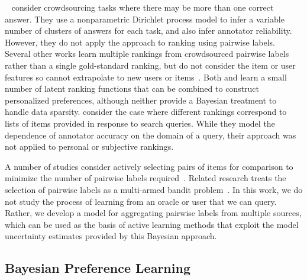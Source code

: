 ~\citet{tian2012learning} consider crowdsourcing tasks where there may be more than one correct answer.
They use a nonparametric Dirichlet process model to infer a variable number of clusters of answers for each task,
and also infer annotator reliability. 
However, they do not apply the approach to ranking using pairwise labels.
Several other works learn multiple rankings from crowdsourced pairwise labels
rather than a single gold-standard ranking, 
but do not consider the item or user features so cannot extrapolate to new users or 
items~\citep{yi_inferring_2013,kim2014latent,wang2016blind,kim2017latent}. 
Both \citet{yi_inferring_2013} and \citet{kim2017latent} learn a small number of
latent ranking functions that can be combined to construct personalized preferences, 
although neither provide a Bayesian treatment to handle data sparsity.
\citet{wang2016blind} consider the case where different rankings correspond to lists of items
provided in response to search queries. 
While they model the dependence of annotator accuracy on the domain of a query,
their approach was not applied to personal or subjective rankings.

A number of studies consider actively selecting pairs of items for
comparison to minimize the number of pairwise labels required~\citep{radlinski2007active,qian2015learning,maystre2017just,cai2017pairwise}.
Related research treats the selection of pairwise labels as a multi-armed bandit problem~\citep{busa2018preference}.
In this work, we do not study the process of learning from an oracle or user that we can query.
Rather, we develop a model for aggregating pairwise labels from multiple sources, 
which can be used as the basis of active learning methods that exploit the model uncertainty 
estimates provided by this Bayesian approach.

\subsection{Bayesian Preference Learning}

